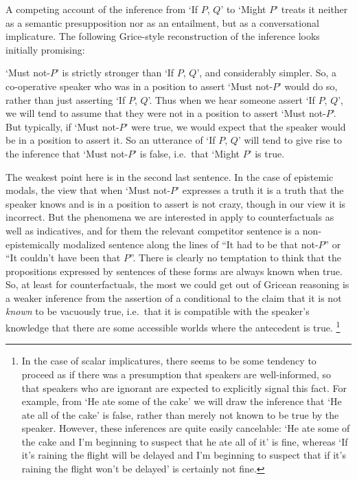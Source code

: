 \documentclass[If.tex]{subfiles}
\begin{document}
A competing account of the inference from ‘If $P$, $Q$’ to ‘Might $P$’ treats it neither as a semantic presupposition nor as an entailment, but as a conversational implicature.  The following Grice-style reconstruction of the inference looks initially promising:
\begin{prop}
	\item
	‘Must not-$P$’ is strictly stronger than ‘If $P$, $Q$’, and considerably simpler.  So, a co-operative speaker who was in a position to assert ‘Must not-$P$’ would do so, rather than just asserting ‘If $P$, $Q$’.   Thus when we hear someone assert ‘If $P$, $Q$’, we will tend to assume that they were not in a position to assert ‘Must not-$P$’.  But typically, if ‘Must not-$P$’ were true, we would expect that the speaker would be in a position to assert it.  So an utterance of ‘If $P$, $Q$’ will tend to give rise to the inference that ‘Must not-$P$’ is false, i.e.\ that ‘Might $P$’ is true.  
\end{prop}
The weakest point here is in the second last sentence.  In the case of epistemic modals, the view that when ‘Must not-$P$’ expresses a truth it is a truth that the speaker knows and is in a position to assert is not crazy, though in our view it is incorrect.  But the phenomena we are interested in apply to counterfactuals as well as indicatives, and for them the relevant competitor sentence is a non-epistemically modalized sentence along the lines of “It had to be that not-$P$” or “It couldn't have been that $P$”.  There is clearly no temptation to think that the propositions expressed by sentences of these forms are always known when true.  So, at least for counterfactuals, the most we could get out of Gricean reasoning is a weaker inference from the assertion of a conditional to the claim that it is not \emph{known} to be vacuously true, i.e.\ that it is compatible with the speaker's knowledge that there are some accessible worlds where the antecedent is true.%
\footnote{In the case of scalar implicatures, there seems to be some tendency to proceed as if there was a presumption that speakers are well-informed, so that speakers who are ignorant are expected to explicitly signal this fact.  For example, from ‘He ate some of the cake’ we will draw the inference that ‘He ate all of the cake’ is false, rather than merely not known to be true by the speaker.  However, these inferences are quite easily cancelable: ‘He ate some of the cake and I'm beginning to suspect that he ate all of it’ is fine, whereas ‘If it's raining the flight will be delayed and I'm beginning to suspect that if it's raining the flight won't be delayed’ is certainly not fine.}  
\end{document}
